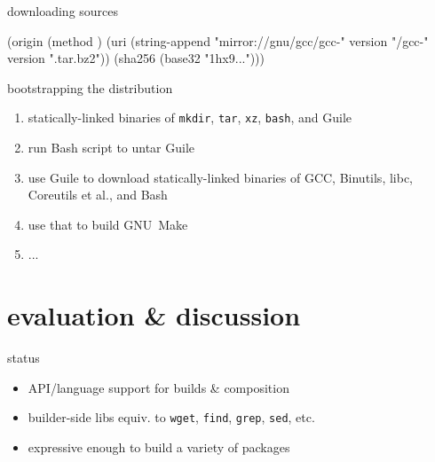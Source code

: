 \documentclass{beamer}
\begin{document}
\begin{frame}[fragile]{downloading sources}
  \begin{semiverbatim}
(\alert{origin}
  (method )
  (uri (string-append "mirror://gnu/gcc/gcc-"
                      version "/gcc-" version
                      ".tar.bz2"))
  (sha256 (base32 "1hx9\textrm{...}")))
  \end{semiverbatim}

\end{frame}

\begin{frame}[fragile]{bootstrapping the distribution}
  \begin{enumerate}
    \setcounter{enumi}{0}
    \item statically-linked binaries of \texttt{mkdir}, \texttt{tar},
      \texttt{xz}, \texttt{bash}, and Guile
    \item run Bash script to untar Guile
    \item use Guile to download statically-linked binaries of GCC,
      Binutils, libc, Coreutils et al., and Bash
    \item use that to build GNU~Make
    \item ...
  \end{enumerate}
\end{frame}

\section{evaluation \& discussion}

\begin{frame}{status}
  \begin{itemize}
  \item API/language support for builds \& composition
  \item builder-side libs equiv. to \texttt{wget}, \texttt{find},
    \texttt{grep}, \texttt{sed}, etc.
  \item expressive enough to build a variety of packages
  \end{itemize}
\end{frame}
\end{document}
